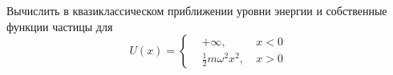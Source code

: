 \begin{leftrules}
	Вычислить в квазиклассическом приближении уровни энергии и собственные функции частицы для
	\begin{equation*}
		U(x) = \left\{
		\begin{aligned}
			&+ \infty, \ &x<0\\
			&\tfrac{1}{2} m \omega^2 x^2, \ &x>0
		\end{aligned}\right.
	\end{equation*}
\end{leftrules}

